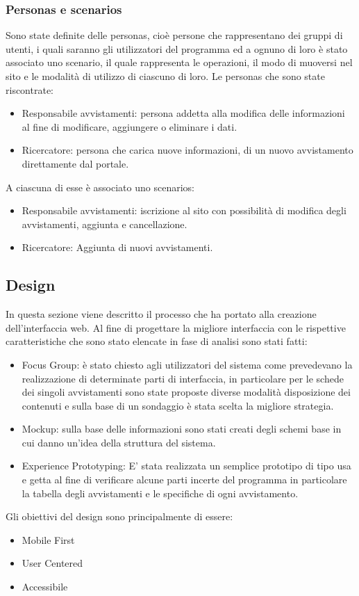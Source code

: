 \documentclass[a4paper,final,12pt]{report}
\begin{document}
\subsubsection{Personas e scenarios}
Sono state definite delle personas, cioè persone che rappresentano dei gruppi di utenti, i quali saranno gli utilizzatori del programma ed a ognuno di loro è stato associato uno scenario, il quale rappresenta le operazioni, il modo di muoversi nel sito e le modalità di utilizzo di ciascuno di loro.
Le personas che sono state riscontrate:
\begin{itemize}
 \item Responsabile avvistamenti: persona addetta alla modifica delle informazioni al fine di modificare, aggiungere o eliminare i dati. 
\item Ricercatore: persona che carica nuove informazioni, di un nuovo avvistamento direttamente dal portale.
 \end{itemize} 
 A ciascuna di esse è associato uno scenarios:
 \begin{itemize}
 \item Responsabile avvistamenti: iscrizione al sito con possibilità di modifica degli avvistamenti, aggiunta e cancellazione.
 \item Ricercatore: Aggiunta di nuovi avvistamenti.
 \end{itemize}

\subsection{Design}
In questa sezione viene descritto il processo che ha portato alla creazione dell'interfaccia web.
Al fine di progettare la migliore interfaccia con le rispettive caratteristiche che sono stato elencate in fase di analisi sono stati fatti:
\begin{itemize}
\item Focus Group: è stato chiesto agli utilizzatori del sistema come prevedevano la realizzazione di determinate parti di interfaccia, in particolare per le schede dei singoli avvistamenti sono state proposte diverse modalità disposizione dei contenuti e sulla base di un sondaggio è stata scelta la migliore strategia.
\item Mockup: sulla base delle informazioni sono stati creati degli schemi base in cui danno un'idea della struttura del sistema.
\item Experience Prototyping: E' stata realizzata un semplice prototipo di tipo usa e getta al fine di verificare alcune parti incerte del programma in particolare la tabella degli avvistamenti e le specifiche di ogni avvistamento.
\end{itemize}
Gli obiettivi del design sono principalmente di essere:
\begin{itemize}
\item Mobile First
\item User Centered
\item Accessibile
\end{itemize}
\end{document}

